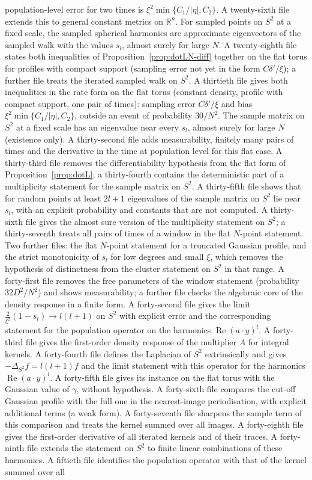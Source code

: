 \documentclass[11pt,a4paper]{article}
\theoremstyle{stmt}
\theoremstyle{defn}
\theoremstyle{rmk}
\numberwithin{equation}{section}
\newcommand{\R}{\mathbb{R}}
\begin{document}
\begin{itemize}
population-level error for two times is $\xi^2\min\{C_1/|\eta|,C_2\}$. A twenty-sixth file extends this to general constant metrics on $\R^n$. For sampled points on $S^2$ at a fixed scale, the sampled spherical harmonics are approximate eigenvectors of the sampled walk with the values $s_l$, almost surely for large $N$. A twenty-eighth file states both inequalities of Proposition~\ref{prop:dotLN-diff} together on the flat torus for profiles with compact support (sampling error not yet in the form $C\delta'/\xi$); a further file treats the iterated sampled walk on $S^2$. A thirtieth file gives both inequalities in the rate form on the flat torus (constant density, profile with compact support, one pair of times): sampling error $C\delta'/\xi$ and bias $\xi^2\min\{C_1/|\eta|,C_2\}$, outside an event of probability $30/N^2$. The sample matrix on $S^2$ at a fixed scale has an eigenvalue near every $s_l$, almost surely for large $N$ (existence only). A thirty-second file adds measurability, finitely many pairs of times and the derivative in the time at population level for this flat case. A thirty-third file removes the differentiability hypothesis from the flat form of Proposition~\ref{prop:dotL}; a thirty-fourth contains the deterministic part of a multiplicity statement for the sample matrix on $S^2$. A thirty-fifth file shows that for random points at least $2l+1$ eigenvalues of the sample matrix on $S^2$ lie near $s_l$, with an explicit probability and constants that are not computed. A thirty-sixth file gives the almost sure version of the multiplicity statement on $S^2$; a thirty-seventh treats all pairs of times of a window in the flat $N$-point statement. Two further files: the flat $N$-point statement for a truncated Gaussian profile, and the strict monotonicity of $s_l$ for low degrees and small $\xi$, which removes the hypothesis of distinctness from the cluster statement on $S^2$ in that range. A forty-first file removes the free parameters of the window statement (probability $32D^2/N^2$) and shows measurability; a further file checks the algebraic core of the density response in a finite form. A forty-second file gives the limit $\tfrac2{\xi^2}(1-s_l)\to l(l+1)$ on $S^2$ with explicit error and the corresponding statement for the population operator on the harmonics $\operatorname{Re}(a\cdot y)^l$. A forty-third file gives the first-order density response of the multiplier $A$ for integral kernels. A forty-fourth file defines the Laplacian of $S^2$ extrinsically and gives $-\Delta_{S^2}f=l(l+1)f$ and the limit statement with this operator for the harmonics $\operatorname{Re}(a\cdot y)^l$. A forty-fifth file gives its instance on the flat torus with the Gaussian value of $\gamma$, without hypothesis. A forty-sixth file compares the cut-off Gaussian profile with the full one in the nearest-image periodisation, with explicit additional terms (a weak form). A forty-seventh file sharpens the sample term of this comparison and treats the kernel summed over all images. A forty-eighth file gives the first-order derivative of all iterated kernels and of their traces. A forty-ninth file extends the statement on $S^2$ to finite linear combinations of these harmonics. A fiftieth file identifies the population operator with that of the kernel summed over all 
\end{itemize}
\end{document}
